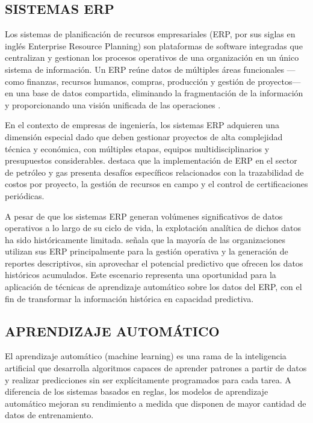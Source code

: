 \documentclass{univalle-perfil}
\begin{document}
\subsection{SISTEMAS ERP}

Los sistemas de planificación de recursos empresariales (ERP, por sus siglas en inglés Enterprise Resource Planning) son plataformas de software integradas que centralizan y gestionan los procesos operativos de una organización en un único sistema de información. Un ERP reúne datos de múltiples áreas funcionales —como finanzas, recursos humanos, compras, producción y gestión de proyectos— en una base de datos compartida, eliminando la fragmentación de la información y proporcionando una visión unificada de las operaciones \parencite{MLdrivenERP2023}.

En el contexto de empresas de ingeniería, los sistemas ERP adquieren una dimensión especial dado que deben gestionar proyectos de alta complejidad técnica y económica, con múltiples etapas, equipos multidisciplinarios y presupuestos considerables. \textcite{Rashid2019} destaca que la implementación de ERP en el sector de petróleo y gas presenta desafíos específicos relacionados con la trazabilidad de costos por proyecto, la gestión de recursos en campo y el control de certificaciones periódicas.

A pesar de que los sistemas ERP generan volúmenes significativos de datos operativos a lo largo de su ciclo de vida, la explotación analítica de dichos datos ha sido históricamente limitada. \textcite{MLdrivenERP2023} señala que la mayoría de las organizaciones utilizan sus ERP principalmente para la gestión operativa y la generación de reportes descriptivos, sin aprovechar el potencial predictivo que ofrecen los datos históricos acumulados. Este escenario representa una oportunidad para la aplicación de técnicas de aprendizaje automático sobre los datos del ERP, con el fin de transformar la información histórica en capacidad predictiva.

\subsection{APRENDIZAJE AUTOMÁTICO}

El aprendizaje automático (machine learning) es una rama de la inteligencia artificial que desarrolla algoritmos capaces de aprender patrones a partir de datos y realizar predicciones sin ser explícitamente programados para cada tarea. A diferencia de los sistemas basados en reglas, los modelos de aprendizaje automático mejoran su rendimiento a medida que disponen de mayor cantidad de datos de entrenamiento.
\end{document}
